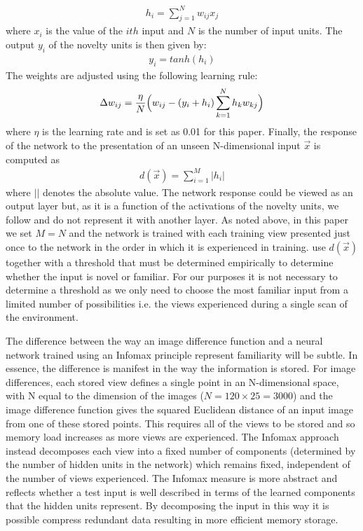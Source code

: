 \documentclass[letterpaper]{article}
\begin{document}
%
\begin{align}
    h_{i}=\sum\limits_{j=1}^N w_{ij}x_{j}   \label{eqn:infomax_activation}
\end{align}
%
where $x_{i}$ is the value of the $ith$ input and $N$ is the number of input units. The output $y_{i}$ of the novelty units is then given by:
%
\begin{align}
    y_{i}=tanh(h_{i})   \label{eqn:infomax_output}
\end{align}
%
The weights are adjusted using the following learning rule: 
%
\begin{align}
    \Delta w_{ij}=\frac{\eta}{N} \Bigl( w_{ij} - (y_{i} + h_{i}) \sum\limits_{k=1}^N h_{k}w_{kj} \Bigr)   \label{eqn:infomax_learning}
\end{align}
%
where $\eta$ is the learning rate and is set as 0.01 for this paper. Finally, the response of the network to the presentation of an unseen N-dimensional input $\vec{x}$ is computed as
%
\begin{align}
    d(\vec{x})=\sum\limits_{i=1}^M |h_{i}|     \label{eqn:infomax_response}
\end{align}
%
where $||$ denotes the absolute value. 
The network response could be viewed as an output layer but, as it is a function of the activations of the novelty units, we follow \citet{Lulham2011} and do not represent it with another layer. 
As noted above, in this paper we set $M=N$ and the network is trained with each training view presented just once to the network in the order in which it is experienced in training. 
\citet{Lulham2011} use $d(\vec{x})$ together with a threshold that must be determined empirically to determine whether the input is novel or familiar. 
For our purposes it is not necessary to determine a threshold as we only need to choose the most familiar input from a limited number of possibilities i.e. the views experienced during a single scan of the environment.

The difference between the way an image difference function and a neural network trained using an Infomax principle represent familiarity will be subtle. 
In essence, the difference is manifest in the way the information is stored. 
For image differences, each stored view defines a single point in an N-dimensional space, with N equal to the dimension of the images ($N = 120 \times 25 = 3000$) and the image difference function gives the squared Euclidean distance of an input image from one of these stored points. 
This requires all of the views to be stored and so memory load increases as more views are experienced. 
The Infomax approach instead decomposes each view into a fixed number of components (determined by the number of hidden units in the network) which remains fixed, independent of the number of views experienced. 
The Infomax measure is more abstract and reflects whether a test input is well described in terms of the learned components that the hidden units represent. 
By decomposing the input in this way it is possible compress redundant data resulting in more efficient memory storage.
\end{document}
